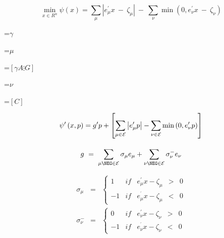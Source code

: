 {\newpage
\clearpage
\samepage \begin{equation}\label{eqn:bcobj2}\min _{x\in R^n}\psi \left( x\right) =\sum_\mu ^{}|e_\mu
^{\prime }x\ -\ \zeta _\mu |\ -\ \sum_\nu ^{}\min (0,e_\nu ^{\prime }x\ -\
\zeta _\nu ) 
\end{equation}
}

{\newpage
\clearpage
\samepage \setbox\sizebox=\hbox{$\gamma $}\box\sizebox
}

{\newpage
\clearpage
\samepage \setbox\sizebox=\hbox{$\mu $}\box\sizebox
}

{\newpage
\clearpage
\samepage \setbox\sizebox=\hbox{$\left[ \gamma A\vdots G\right] \,$}\box\sizebox
}

{\newpage
\clearpage
\samepage \setbox\sizebox=\hbox{$\nu $}\box\sizebox
}

{\newpage
\clearpage
\samepage \setbox\sizebox=\hbox{$\left[ C\right] $}\box\sizebox
}

{\newpage
\clearpage
\samepage \begin{equation}\label{eqn:dd}
\psi^{\prime }\left( x, p\right)  = 
g^{\prime }p+ \left[ \sum_{\mu \in {\cal E}}\left| e_\mu
^{\prime }p\right| -\sum_{\nu \in {\cal E}}\min \left( 0,e_\nu ^{\prime
}p\right) \right] 
\end{equation}
}

{\newpage
\clearpage
\samepage \begin{equation}\label{eqn:gradient}g\ =\ \sum_{\mu \NEG \in {\cal E}}^{}\sigma _\mu e_\mu
+\sum_{\nu \NEG \in {\cal E}}^{}\sigma _\nu ^{-}e_\nu 
\end{equation}
}

{\newpage
\clearpage
\samepage \begin{equation}\label{eqn:sigma} 
\begin{array}{lll}
\sigma _\mu & = & \left\{ 
\begin{array}{lllll}
1 & if & e_\mu ^{\prime }x-\zeta _\mu & > & 0 \\  
-1 & if & e_\mu ^{^{\prime }}x-\zeta _\mu & < & 0 
\end{array}
\right. \\  
\sigma _\nu ^{-} & = & \left\{ 
\begin{array}{lllll}
0 & if & e_\nu ^{\prime }x-\zeta _\nu & > & 0 \\  
-1 & if & e_\nu ^{^{\prime }}x-\zeta _\nu & < & 0 
\end{array}
\right. 
\end{array}
\end{equation}
}

